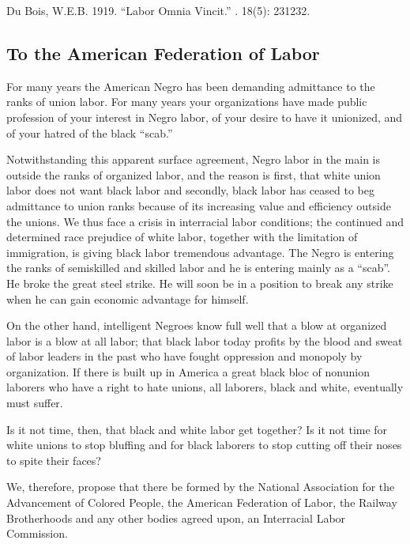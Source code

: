 \documentclass[letterpaper,10pt,english]{jupyterBook}
\begin{document}
\sphinxAtStartPar
{} Du Bois, W.E.B. 1919. “Labor Omnia Vincit.” . 18(5): 231\sphinxhyphen{}232.


\subsection{To the American Federation of Labor}
\label{\detokenize{Volumes/28/04/american_federation_of_labor:to-the-american-federation-of-labor}}\label{\detokenize{Volumes/28/04/american_federation_of_labor::doc}}
\sphinxAtStartPar
For many years the American Negro has been demanding admittance to the ranks of union labor. For many years your organizations have made public profession of your interest in Negro labor, of your desire to have it unionized, and of your hatred of the black “scab.”

\sphinxAtStartPar
Notwithstanding this apparent surface agreement, Negro labor in the main is outside the ranks of organized labor, and the reason is first, that white union labor does not want black labor and secondly, black labor has ceased to beg admittance to union ranks because of its increasing value and efficiency outside the unions. We thus face a crisis in interracial labor conditions; the continued and determined race prejudice of white labor, together with the limitation of immigration, is giving black labor tremendous advantage. The Negro is entering the ranks of semi\sphinxhyphen{}skilled and skilled labor and he is entering mainly as a “scab”. He broke the great steel strike. He will soon be in a position to break any strike when he can gain economic advantage for himself.

\sphinxAtStartPar
On the other hand, intelligent Negroes know full well that a blow at organized labor is a blow at all labor; that black labor today profits by the blood and sweat of labor leaders in the past who have fought oppression and monopoly by organization. If there is built up in America a great black bloc of non\sphinxhyphen{}union laborers who have a right to hate unions, all laborers, black and white, eventually must suffer.

\sphinxAtStartPar
Is it not time, then, that black and white labor get together? Is it not time for white unions to stop bluffing and for black laborers to stop cutting off their noses to spite their faces?

\sphinxAtStartPar
We, therefore, propose that there be formed by the National Association for the Advancement of Colored People, the American Federation of Labor, the Railway Brotherhoods and any other bodies agreed upon, an Interracial Labor Commission.
\end{document}
